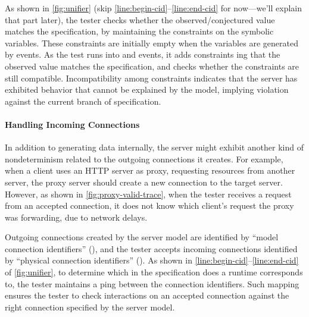 As shown in \autoref{fig:unifier} (skip
\autoref{line:begin-cid}--\ref{line:end-cid} for now---we'll
explain that part later), the tester checks whether the observed/conjectured
value matches the specification, by maintaining the constraints on the symbolic
variables.  These constraints are initially empty when the variables are
generated by  events.  As the test runs into  and
 events, it adds constraints ing that the observed value
matches the specification, and checks whether the constraints are still
compatible.  Incompatibility among constraints indicates that the server has
exhibited behavior that cannot be explained by the model, implying violation
against the current branch of specification.

\paragraph*{Handling Incoming Connections}
In addition to generating data internally, the server might exhibit another kind
of nondeterminism related to the outgoing connections it creates.  For example,
when a client uses an HTTP server as proxy, requesting resources from another
server, the proxy server should create a new connection to the target server.
However, as shown in \autoref{fig:proxy-valid-trace}, when the tester receives a
request from an accepted connection, it does not know which client's
request the proxy was forwarding, due to network delays.

Outgoing connections created by the server model are identified by ``model
connection identifiers'' (), and the tester accepts incoming
connections identified by ``physical connection identifiers'' ().  As
shown in \autoref{line:begin-cid}--\ref{line:end-cid} of
\autoref{fig:unifier}, to determine which  in the specification does a
runtime  corresponds to, the tester maintains a ping between
the connection identifiers.  Such mapping ensures the tester to check
interactions on an accepted connection against the right connection specified by
the server model.

